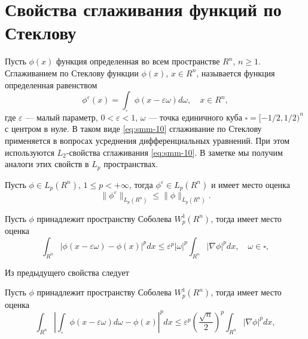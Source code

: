 	
\section{Свойства сглаживания функций по Стеклову}
Пусть $\phi(x)$ функция определенная во всем пространстве  $R^n$, $n\geqslant1$. Сглаживанием по Стеклову функции $\phi(x)$, $x\in R^n$, называется функция определенная равенством
\begin{equation}\label{eq:smm-10}
\phi^\varepsilon (x)=\int_\square \phi(x-\varepsilon \omega)d\omega, \quad   x\in R^n, 
\end{equation}                
где  $\varepsilon$ --- малый параметр,  $0<\varepsilon<1$, $\omega$ --- точка единичного куба $\square=[-1/2,1/2)^n$ с центром в нуле.
В таком виде \eqref{eq:smm-10} сглаживание по Стеклову применяется в вопросах усреднения дифференциальных уравнений. При этом используются $L_2$-свойства сглаживания \eqref{eq:smm-10}. В заметке мы получим аналоги этих свойств в  $L_p$ пространствах.

\begin{property}\label{prop:smm-1}
	Пусть  $\phi\in L_p (R^n)$, $1\leqslant p<+\infty$, тогда 
	$\phi^\varepsilon\in L_p (R^n)$ и имеет место оценка
	$$
	\|\phi^\varepsilon\|_{L_p (R^n )} \leqslant\|\phi\|_{L_p (R^n)}.    
	$$
\end{property}

\begin{property}\label{prop:smm-2}
	Пусть $\phi$ принадлежит пространству Соболева $W_p^1 (R^n)$, тогда имеет место оценка
	$$
	\int_{R^n}|\phi(x-\varepsilon\omega)-\phi(x)|^p  dx \leqslant \varepsilon^p |\omega|^p  \int_{R^n}|\nabla \phi|^p dx,   \quad \omega\in\square,        
	$$
\end{property}


Из предыдущего свойства следует

\begin{property}\label{prop:smm-3}
	Пусть $\phi$ принадлежит пространству Соболева $W_p^1 (R^n)$, тогда имеет место оценка
	$$
	\int_{R^n}\left|\int_\square\phi(x-\varepsilon\omega)d\omega-\phi(x)\right|^p  dx \leqslant \varepsilon^p \left(\frac{\sqrt{n}}{2}\right)^p  \int_{R^n}|\nabla \phi|^p dx,         
	$$
\end{property}



